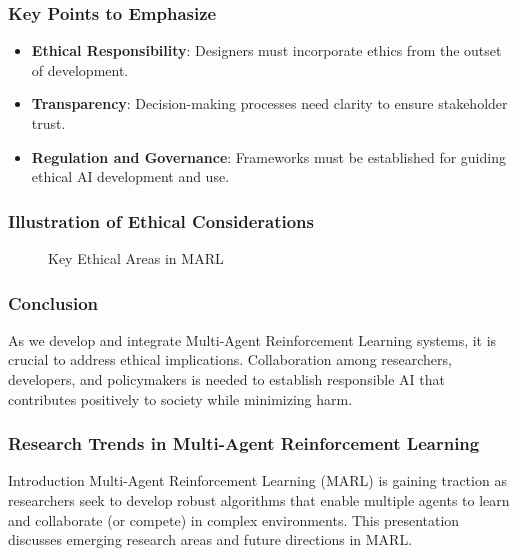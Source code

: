 \documentclass[aspectratio=169]{beamer}
\begin{document}
\begin{frame}[fragile]
    \frametitle{Key Points to Emphasize}
    \begin{itemize}
        \item \textbf{Ethical Responsibility}: Designers must incorporate ethics from the outset of development.
        \item \textbf{Transparency}: Decision-making processes need clarity to ensure stakeholder trust.
        \item \textbf{Regulation and Governance}: Frameworks must be established for guiding ethical AI development and use.
    \end{itemize}
\end{frame}

\begin{frame}[fragile]
    \frametitle{Illustration of Ethical Considerations}
    \centering
    \begin{figure}
        \caption{Key Ethical Areas in MARL}
    \end{figure}
\end{frame}

\begin{frame}[fragile]
    \frametitle{Conclusion}
    As we develop and integrate Multi-Agent Reinforcement Learning systems, it is crucial to address ethical implications. 
    Collaboration among researchers, developers, and policymakers is needed to establish responsible AI that contributes positively to society while minimizing harm.
\end{frame}

\begin{frame}[fragile]
    \frametitle{Research Trends in Multi-Agent Reinforcement Learning}
    \begin{block}{Introduction}
        Multi-Agent Reinforcement Learning (MARL) is gaining traction as researchers seek to develop robust algorithms that enable multiple agents to learn and collaborate (or compete) in complex environments. This presentation discusses emerging research areas and future directions in MARL.
    \end{block}
\end{frame}
\end{document}
